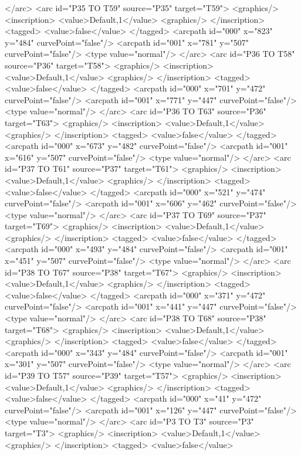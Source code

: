 </arc>
<arc id="P35 TO T59" source="P35" target="T59">
<graphics/>
<inscription>
<value>Default,1</value>
<graphics/>
</inscription>
<tagged>
<value>false</value>
</tagged>
<arcpath id="000" x="823" y="484" curvePoint="false"/>
<arcpath id="001" x="781" y="507" curvePoint="false"/>
<type value="normal"/>
</arc>
<arc id="P36 TO T58" source="P36" target="T58">
<graphics/>
<inscription>
<value>Default,1</value>
<graphics/>
</inscription>
<tagged>
<value>false</value>
</tagged>
<arcpath id="000" x="701" y="472" curvePoint="false"/>
<arcpath id="001" x="771" y="447" curvePoint="false"/>
<type value="normal"/>
</arc>
<arc id="P36 TO T63" source="P36" target="T63">
<graphics/>
<inscription>
<value>Default,1</value>
<graphics/>
</inscription>
<tagged>
<value>false</value>
</tagged>
<arcpath id="000" x="673" y="482" curvePoint="false"/>
<arcpath id="001" x="616" y="507" curvePoint="false"/>
<type value="normal"/>
</arc>
<arc id="P37 TO T61" source="P37" target="T61">
<graphics/>
<inscription>
<value>Default,1</value>
<graphics/>
</inscription>
<tagged>
<value>false</value>
</tagged>
<arcpath id="000" x="521" y="474" curvePoint="false"/>
<arcpath id="001" x="606" y="462" curvePoint="false"/>
<type value="normal"/>
</arc>
<arc id="P37 TO T69" source="P37" target="T69">
<graphics/>
<inscription>
<value>Default,1</value>
<graphics/>
</inscription>
<tagged>
<value>false</value>
</tagged>
<arcpath id="000" x="493" y="484" curvePoint="false"/>
<arcpath id="001" x="451" y="507" curvePoint="false"/>
<type value="normal"/>
</arc>
<arc id="P38 TO T67" source="P38" target="T67">
<graphics/>
<inscription>
<value>Default,1</value>
<graphics/>
</inscription>
<tagged>
<value>false</value>
</tagged>
<arcpath id="000" x="371" y="472" curvePoint="false"/>
<arcpath id="001" x="441" y="447" curvePoint="false"/>
<type value="normal"/>
</arc>
<arc id="P38 TO T68" source="P38" target="T68">
<graphics/>
<inscription>
<value>Default,1</value>
<graphics/>
</inscription>
<tagged>
<value>false</value>
</tagged>
<arcpath id="000" x="343" y="484" curvePoint="false"/>
<arcpath id="001" x="301" y="507" curvePoint="false"/>
<type value="normal"/>
</arc>
<arc id="P39 TO T57" source="P39" target="T57">
<graphics/>
<inscription>
<value>Default,1</value>
<graphics/>
</inscription>
<tagged>
<value>false</value>
</tagged>
<arcpath id="000" x="41" y="472" curvePoint="false"/>
<arcpath id="001" x="126" y="447" curvePoint="false"/>
<type value="normal"/>
</arc>
<arc id="P3 TO T3" source="P3" target="T3">
<graphics/>
<inscription>
<value>Default,1</value>
<graphics/>
</inscription>
<tagged>
<value>false</value>
